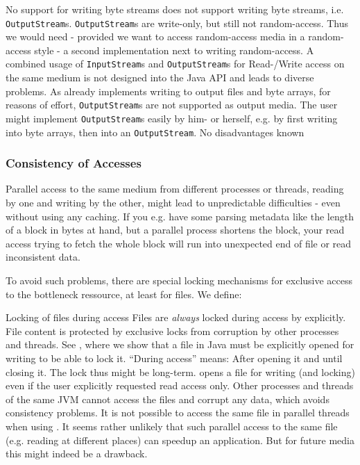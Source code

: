 {%
No support for writing byte streams
}
{%
\LibName{} does not support writing byte streams, i.e. \texttt{OutputStream}s.
}
{%
\texttt{OutputStream}s are write-only, but still not random-access. Thus we would need \-- provided we want to access random-access media in a random-access style \-- a second implementation next to writing random-access. A combined usage of \texttt{InputStream}s and \texttt{OutputStream}s for Read-/Write access on the same medium is not designed into the Java API and leads to diverse problems. As \LibName{} already implements writing to output files and byte arrays, for reasons of effort, \texttt{OutputStream}s are not supported as output media. The user might implement \texttt{OutputStream}s easily by him- or herself, e.g. by first writing into byte arrays, then into an \texttt{OutputStream}.
}
{%
No disadvantages known
}


\subsubsection{Consistency of  \TERMmedium{} Accesses}
\label{sec:KonsPerfMedia}

Parallel access to the same medium from different processes or threads, reading by one and writing by the other, might lead to unpredictable difficulties - even without using any caching. If you e.g. have some parsing metadata like the length of a block in bytes at hand, but a parallel process shortens the block, your read access trying to fetch the whole block will run into unexpected end of file or read inconsistent data.

To avoid such problems, there are special locking mechanisms for exclusive access to the bottleneck ressource, at least for files. We define:

{%
Locking of files during \LibName{} access
}
{%
Files are \emph{always} locked during access by \LibName{} explicitly. File content is protected by exclusive locks from corruption by other processes and threads. See \cite{PWikIO}, where we show that a file in Java must be explicitly opened for writing to be able to lock it. ``During access'' means: After opening it and until closing it. The lock thus might be long-term. \LibName{} opens a file for writing (and locking) even if the user explicitly requested read access only.
}
{%
Other processes and threads of the same JVM cannot access the files and corrupt any data, which avoids consistency problems.
}
{%
It is not possible to access the same file in parallel threads when using \LibName{}. It seems rather unlikely that such parallel access to the same file (e.g. reading at different places) can speedup an application. But for future media this might indeed be a drawback.
}


